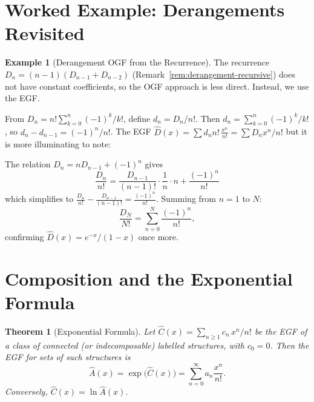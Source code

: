 \documentclass[12pt,a4paper,openany]{book}
\theoremstyle{definition}
\newtheorem{example}[definition]{Example}
\theoremstyle{plain}
\newtheorem{theorem}[definition]{Theorem}
\theoremstyle{remark}
\begin{document}

\section{Worked Example: Derangements Revisited}\label{sec:ogf-derangements}

\begin{example}[Derangement OGF from the Recurrence]\label{ex:derangement-ogf}
The recurrence $D_n = (n-1)(D_{n-1}+D_{n-2})$ (Remark~\ref{rem:derangement-recursive})
does not have constant coefficients, so the OGF approach is less
direct.  Instead, we use the EGF.

From $D_n = n!\sum_{k=0}^n(-1)^k/k!$, define $d_n = D_n/n!$.  Then
$d_n = \sum_{k=0}^n(-1)^k/k!$, so $d_n - d_{n-1} = (-1)^n/n!$.
The EGF $\hat{D}(x) = \sum d_n n!\,\frac{x^n}{n!} = \sum D_n x^n/n!$
but it is more illuminating to note:

The relation $D_n = nD_{n-1} + (-1)^n$ gives
\[
  \frac{D_n}{n!} = \frac{D_{n-1}}{(n-1)!}\cdot\frac{1}{n}\cdot n + \frac{(-1)^n}{n!}
\]
which simplifies to $\frac{D_n}{n!} - \frac{D_{n-1}}{(n-1)!} = \frac{(-1)^n}{n!}$.
Summing from $n=1$ to $N$:
\[
  \frac{D_N}{N!} = \sum_{n=0}^{N}\frac{(-1)^n}{n!},
\]
confirming $\hat{D}(x) = e^{-x}/(1-x)$ once more.
\end{example}



\section{Composition and the Exponential Formula}\label{sec:exponential-formula}

\begin{theorem}[Exponential Formula]\label{thm:exponential-formula}
Let $\hat{C}(x) = \sum_{n\ge 1}c_n\,x^n/n!$ be the EGF of a class of
connected (or indecomposable) labelled structures, with $c_0 = 0$.
Then the EGF for \emph{sets of such structures} is
\[
  \hat{A}(x) = \exp\!\bigl(\hat{C}(x)\bigr)
  = \sum_{n=0}^{\infty}a_n\frac{x^n}{n!}.
\]
Conversely, $\hat{C}(x) = \ln\hat{A}(x)$.
\end{theorem}
\end{document}
